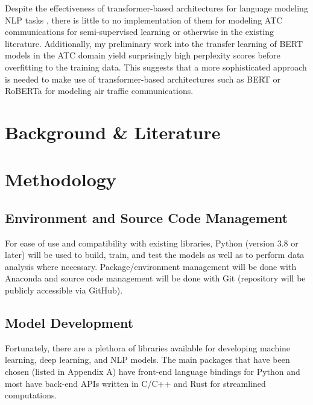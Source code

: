 \documentclass[10pt]{article}
\begin{document}
        Despite the effectiveness of transformer-based architectures for language modeling NLP tasks
        \cite{devlin_bert_2019,lewis_bart_2019,liu2019roberta}, there is little to no implementation
        of them for modeling ATC communications for semi-supervised learning or otherwise in the
        existing literature.
        Additionally, my preliminary work into the transfer learning of BERT models in the ATC
        domain yield surprisingly high perplexity scores before overfitting to the training data.
        This suggests that a more sophisticated approach is needed to make use of transformer-based
        architectures such as BERT or RoBERTa for modeling air traffic communications.

    \section{Background \& Literature}


    \section{Methodology}
        \subsection{Environment and Source Code Management}
            For ease of use and compatibility with existing libraries, Python (version 3.8 or later)
            will be used to build, train, and test the models as well as to perform data analysis
            where necessary.
            Package/environment management will be done with Anaconda and source code management
            will be done with Git (repository will be publicly accessible via GitHub).

        \subsection{Model Development}
            Fortunately, there are a plethora of libraries available for developing machine learning,
            deep learning, and NLP models.
            The main packages that have been chosen (listed in Appendix A) have front-end language
            bindings for Python and most have back-end APIs written in C/C++ and Rust for streamlined computations.
\end{document}
